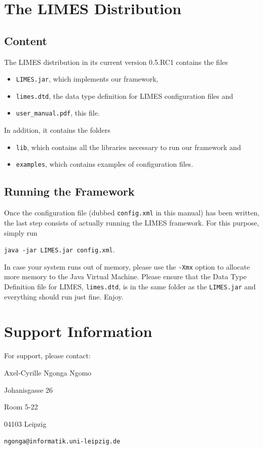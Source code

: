 \documentclass[a4paper, 11pt]{article}
\begin{document}
\section{The LIMES Distribution}
\subsection{Content}
The LIMES distribution in its current version 0.5.RC1 contains the files
\begin{itemize}
\item \texttt{LIMES.jar}, which implements our framework,
\item \texttt{limes.dtd}, the data type definition for LIMES configuration files and
\item \texttt{user\_manual.pdf}, this file.
\end{itemize}
In addition, it contains the folders
\begin{itemize}
\item \texttt{lib}, which contains all the libraries necessary to run our framework and
\item \texttt{examples}, which contains examples of configuration files.
\end{itemize}
\subsection{Running the Framework}
Once the configuration file (dubbed \texttt{config.xml} in this manual) has been written, the last step consists of actually running the LIMES framework. For this purpose, simply run

\texttt{java -jar LIMES.jar config.xml}.

In case your system runs out of memory, please use the \texttt{-Xmx} option to allocate more memory to the Java Virtual Machine. Please ensure that the Data Type Definition file for LIMES, \texttt{limes.dtd}, is in the same folder as the \texttt{LIMES.jar} and everything should run just fine. Enjoy.

\section{Support Information}
For support, please contact:

Axel-Cyrille Ngonga Ngomo

Johanisgasse 26

Room 5-22

04103 Leipzig

\verb#ngonga@informatik.uni-leipzig.de#
\end{document}
